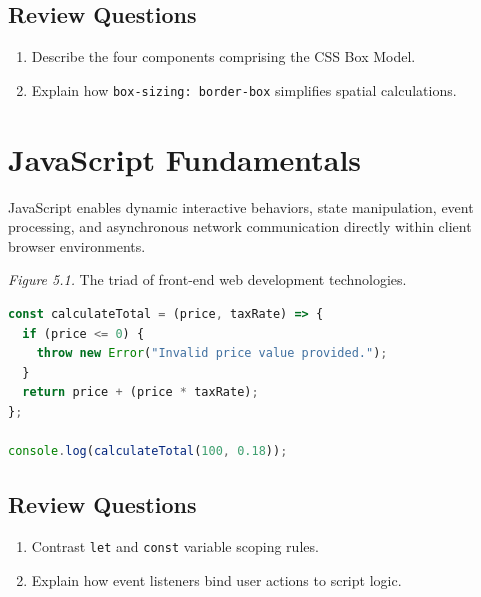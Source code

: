 \documentclass[11pt,openany,oneside]{book}
\begin{document}
\section*{Review Questions}
\begin{enumerate}
\item Describe the four components comprising the CSS Box Model.
\item Explain how \texttt{box-sizing: border-box} simplifies spatial calculations.
\end{enumerate}

\chapter{JavaScript Fundamentals}
JavaScript enables dynamic interactive behaviors, state manipulation, event processing, and asynchronous network communication directly within client browser environments.

\begin{center}
\end{center}
\textit{Figure 5.1.} The triad of front-end web development technologies.

\begin{lstlisting}[style=webcode,language=JavaScript]
const calculateTotal = (price, taxRate) => {
  if (price <= 0) {
    throw new Error("Invalid price value provided.");
  }
  return price + (price * taxRate);
};

console.log(calculateTotal(100, 0.18));
\end{lstlisting}

\section*{Review Questions}
\begin{enumerate}
\item Contrast \texttt{let} and \texttt{const} variable scoping rules.
\item Explain how event listeners bind user actions to script logic.
\end{enumerate}
\end{document}
